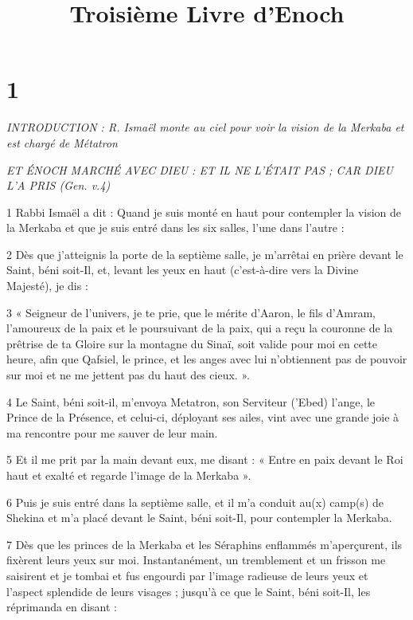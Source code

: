 

\title{Troisième Livre d'Enoch}

\chapter{1}

\par \textit{INTRODUCTION : R. Ismaël monte au ciel pour voir la vision de la Merkaba et est chargé de Métatron}

\par \textit{ET ÉNOCH MARCHÉ AVEC DIEU : ET IL NE L'ÉTAIT PAS ; CAR DIEU L'A PRIS (Gen. v.4)}

\par 1 Rabbi Ismaël a dit : Quand je suis monté en haut pour contempler la vision de la Merkaba et que je suis entré dans les six salles, l'une dans l'autre :

\par 2 Dès que j'atteignis la porte de la septième salle, je m'arrêtai en prière devant le Saint, béni soit-Il, et, levant les yeux en haut (c'est-à-dire vers la Divine Majesté), je dis :

\par 3 « Seigneur de l'univers, je te prie, que le mérite d'Aaron, le fils d'Amram, l'amoureux de la paix et le poursuivant de la paix, qui a reçu la couronne de la prêtrise de ta Gloire sur la montagne du Sinaï, soit valide pour moi en cette heure, afin que Qafsiel, le prince, et les anges avec lui n'obtiennent pas de pouvoir sur moi et ne me jettent pas du haut des cieux. ».

\par 4 Le Saint, béni soit-il, m'envoya Metatron, son Serviteur ('Ebed) l'ange, le Prince de la Présence, et celui-ci, déployant ses ailes, vint avec une grande joie à ma rencontre pour me sauver de leur main.

\par 5 Et il me prit par la main devant eux, me disant : « Entre en paix devant le Roi haut et exalté et regarde l'image de la Merkaba ».

\par 6 Puis je suis entré dans la septième salle, et il m'a conduit au(x) camp(s) de Shekina et m'a placé devant le Saint, béni soit-Il, pour contempler la Merkaba.

\par 7 Dès que les princes de la Merkaba et les Séraphins enflammés m'aperçurent, ils fixèrent leurs yeux sur moi. Instantanément, un tremblement et un frisson me saisirent et je tombai et fus engourdi par l'image radieuse de leurs yeux et l'aspect splendide de leurs visages ; jusqu'à ce que le Saint, béni soit-Il, les réprimanda en disant :


